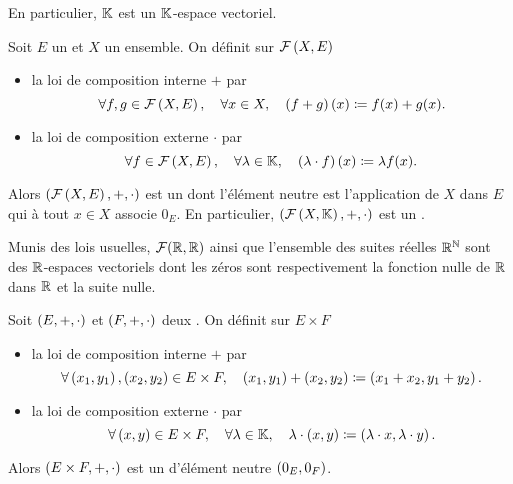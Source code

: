 \documentclass{magnolia}
\begin{document}
\begin{remarqueUnique}
\remarque[utile=-1] En particulier, $\mathbb{K}$ est un $\mathbb{K}$-espace vectoriel.
\end{remarqueUnique}


\begin{definition}[utile=-3]
Soit $E$ un \Kev et $X$ un ensemble. On définit sur
$\mathcal{F}\left(X,E\right)$
\begin{itemize}
\item la loi de composition interne $+$ par
  \[\forall f,g\in\mathcal{F}\left(X,E\right) ,\quad \forall x\in X ,\quad
    \left(f+g\right)(x)\coloneqq f(x)+g(x).\]
\item la loi de composition externe $\cdot$ par
  \[\forall f\in\mathcal{F}\left(X,E\right) ,\quad \forall \lambda\in\mathbb{K} ,\quad
    \left(\lambda\cdot f\right)(x)\coloneqq\lambda f(x).\]
\end{itemize}
Alors $\left(\mathcal{F}\left(X,E\right),+,\cdot\right)$ est un \Kev dont l'élément neutre est
l'application de $X$ dans $E$ qui à tout $x\in X$ associe $0_E$. En particulier,
$\left(\mathcal{F}\left(X,\mathbb{K}\right),+,\cdot\right)$ est un \Kev.
\end{definition}

\begin{remarqueUnique}
\remarque[utile=-3] Munis des lois usuelles, $\mathcal{F}(\mathbb{R},\mathbb{R})$ ainsi que l'ensemble 
  des suites réelles $\mathbb{R}^{\mathbb{N}}$  sont des
  $\mathbb{R}$-espaces vectoriels dont les \og zéros \fg sont respectivement la fonction
  nulle de $\mathbb{R}$ dans $\mathbb{R}$ et la suite nulle.
\end{remarqueUnique}

\begin{definition}[utile=-2]
Soit $\left(E,+,\cdot\right)$ et $\left(F,+,\cdot\right)$ deux \Kevs. On définit sur $E\times F$
\begin{itemize}
\item la loi de composition interne $+$ par
  \[\forall \left(x_1,y_1\right),\left(x_2,y_2\right)\in E\times F ,\quad
    \left(x_1,y_1\right)+\left(x_2,y_2\right)\coloneqq\left(x_1+x_2,y_1+y_2\right).\]
\item la loi de composition externe $\cdot$ par
  \[\forall \left(x,y\right)\in E\times F ,\quad \forall \lambda\in\mathbb{K} ,\quad
    \lambda\cdot\left(x,y\right)\coloneqq\left(\lambda\cdot x,\lambda\cdot y\right).\]
\end{itemize}
Alors $\left(E\times F,+,\cdot\right)$ est un \Kev d'élément neutre $\left(0_E,0_F\right)$.
\end{definition}
\end{document}
